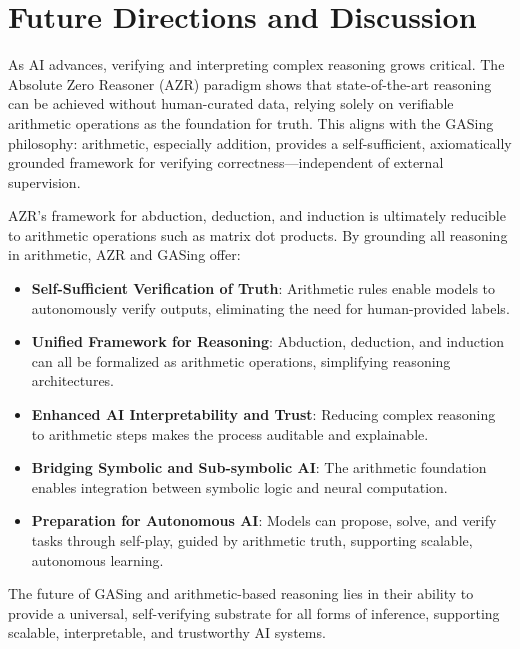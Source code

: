 \section{Future Directions and Discussion}

As AI advances, verifying and interpreting complex reasoning grows critical. The Absolute Zero Reasoner (AZR) paradigm shows that state-of-the-art reasoning can be achieved without human-curated data, relying solely on verifiable arithmetic operations as the foundation for truth. This aligns with the GASing philosophy: arithmetic, especially addition, provides a self-sufficient, axiomatically grounded framework for verifying correctness—independent of external supervision.

AZR's framework for abduction, deduction, and induction is ultimately reducible to arithmetic operations such as matrix dot products. By grounding all reasoning in arithmetic, AZR and GASing offer:
\begin{itemize}
    \item \textbf{Self-Sufficient Verification of Truth}: Arithmetic rules enable models to autonomously verify outputs, eliminating the need for human-provided labels.
    \item \textbf{Unified Framework for Reasoning}: Abduction, deduction, and induction can all be formalized as arithmetic operations, simplifying reasoning architectures.
    \item \textbf{Enhanced AI Interpretability and Trust}: Reducing complex reasoning to arithmetic steps makes the process auditable and explainable.
    \item \textbf{Bridging Symbolic and Sub-symbolic AI}: The arithmetic foundation enables integration between symbolic logic and neural computation.
    \item \textbf{Preparation for Autonomous AI}: Models can propose, solve, and verify tasks through self-play, guided by arithmetic truth, supporting scalable, autonomous learning.
\end{itemize}

The future of GASing and arithmetic-based reasoning lies in their ability to provide a universal, self-verifying substrate for all forms of inference, supporting scalable, interpretable, and trustworthy AI systems.
